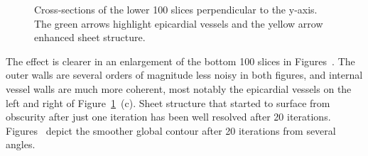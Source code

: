     \begin{figure}
      \centering
      \caption{Cross-sections of the lower 100 slices perpendicular to the y-axis. The green arrows highlight epicardial vessels and the yellow arrow enhanced sheet structure.}
      \label{fig:adjusted_bottom_vessels_1_287}
    \end{figure}
    
    The effect is clearer in an enlargement of the bottom 100 slices in Figures~. The outer walls are several orders of magnitude less noisy in both figures, and internal vessel walls are much more coherent, most notably the epicardial vessels on the left and right of Figure~\ref{fig:adjusted_bottom_vessels_1_287}~(c). Sheet structure that started to surface from obscurity after just one iteration has been well resolved after 20 iterations. Figures~ depict the smoother global contour after 20 iterations from several angles.
    
